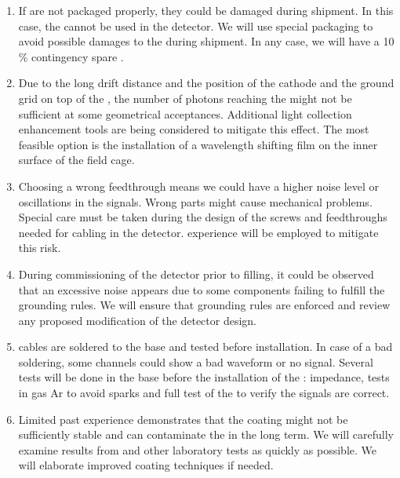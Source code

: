 \begin{enumerate}
\item If  are not packaged properly, they could be damaged during shipment. In this case, the  cannot be used in the detector. We will use special packaging to avoid possible damages to the  during shipment. In any case, we will have a 10 \% contingency spare .

\item Due to the long drift distance and the position of the cathode and the ground grid on top of the , the number of photons reaching the  might not be sufficient at some geometrical acceptances. Additional light collection enhancement tools are being considered to mitigate this effect. The most feasible option is the installation of a wavelength shifting film on the inner surface of the field cage.

\item Choosing a wrong feedthrough means we could have a higher noise level or oscillations in the signals. Wrong parts might cause mechanical problems. Special care must be taken during the design of the screws and  feedthroughs needed for cabling in the detector.  experience will be employed to mitigate this risk.

\item During commissioning of the detector prior to  filling, it could be observed that an excessive noise appears due to some components failing to fulfill the grounding rules. We will ensure that grounding rules are enforced and review any proposed modification of the detector design.

\item {} cables are soldered to the  base and tested before installation. In case of a bad soldering, some channels could show a bad waveform or no signal. Several tests will be done in the base before the installation of the : impedance,  tests in gas Ar to avoid sparks and full test of the  to verify the signals are correct.

\item Limited past experience demonstrates that the  coating might not be sufficiently stable and can contaminate the  in the long term. We will carefully examine results from  and other laboratory tests as quickly as possible. We will elaborate improved coating techniques if needed.

\end{enumerate}